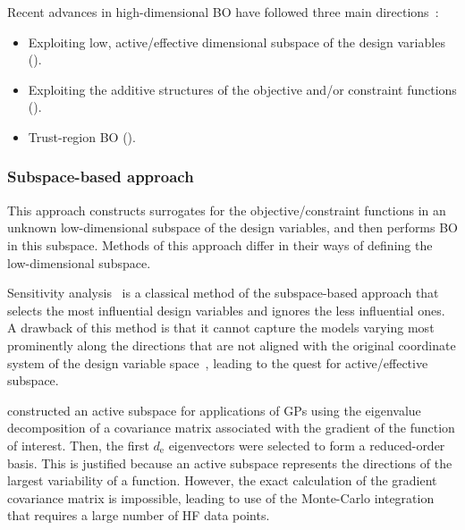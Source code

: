 \documentclass[journal ]{new-aiaa}
\begin{document}
Recent advances in high-dimensional BO have followed three main directions~\citep{Daulton2022MOBO}: 
\begin{itemize}
	\item Exploiting low, active/effective dimensional subspace of the design variables ().
	
	\item Exploiting the additive structures of the objective and/or constraint functions ().
	
	\item Trust-region BO ().
\end{itemize}

\subsubsection{Subspace-based approach}\label{Sec621}

This approach constructs surrogates for the objective/constraint functions in an unknown low-dimensional subspace of the design variables, and then performs BO in this subspace.
Methods of this approach differ in their ways of defining the low-dimensional subspace.

Sensitivity analysis~\citep{Spagnol2019} is a classical method of the subspace-based approach that selects the most influential design variables and ignores the less influential ones.
A drawback of this method is that it cannot capture the models varying most prominently along the directions that are not aligned with the original coordinate system of the design variable space~\citep{Constantine2014}, leading to the quest for active/effective subspace.

\citet{Constantine2014} constructed an active subspace for applications of GPs using the eigenvalue decomposition of a covariance matrix associated with the gradient of the function of interest.
Then, the first $d_\text{e}$ eigenvectors were selected to form a reduced-order basis.
This is justified because an active subspace represents the directions of the largest variability of a function.
However, the exact calculation of the gradient covariance matrix is impossible, leading to use of the Monte-Carlo integration that requires a large number of HF data points.  
\end{document}
